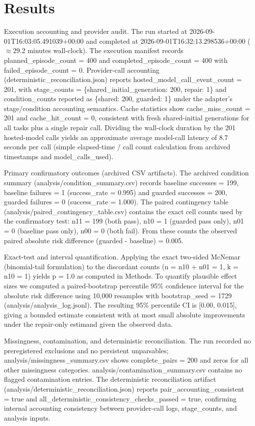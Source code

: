 \documentclass[conference]{IEEEtran}
\begin{document}
\section{Results}
Execution accounting and provider audit. The run started at 2026-09-01T16:03:05.491039+00:00 and completed at 2026-09-01T16:32:13.298536+00:00 (\ensuremath{\approx}29.2 minutes wall-clock). The execution manifest records planned\_episode\_count = 400 and completed\_episode\_count = 400 with failed\_episode\_count = 0. Provider-call accounting (deterministic\_reconciliation.json) reports hosted\_model\_call\_event\_count = 201, with stage\_counts = \{shared\_initial\_generation: 200, repair: 1\} and condition\_counts reported as \{shared: 200, guarded: 1\} under the adapter's stage/condition accounting semantics. Cache statistics show cache\_miss\_count = 201 and cache\_hit\_count = 0, consistent with fresh shared-initial generations for all tasks plus a single repair call. Dividing the wall-clock duration by the 201 hosted-model calls yields an approximate average model-call latency of 8.7 seconds per call (simple elapsed-time / call count calculation from archived timestamps and model\_calls\_used).

Primary confirmatory outcomes (archived CSV artifacts). The archived condition summary (analysis/condition\_summary.csv) records baseline successes = 199, baseline failures = 1 (success\_rate = 0.995) and guarded successes = 200, guarded failures = 0 (success\_rate = 1.000). The paired contingency table (analysis/paired\_contingency\_table.csv) contains the exact cell counts used by the confirmatory test: n11 = 199 (both pass), n10 = 1 (guarded pass only), n01 = 0 (baseline pass only), n00 = 0 (both fail). From these counts the observed paired absolute risk difference (guarded - baseline) = 0.005.

Exact-test and interval quantification. Applying the exact two-sided McNemar (binomial-tail formulation) to the discordant counts (n = n10 + n01 = 1, k = n10 = 1) yields p = 1.0 as computed in Methods. To quantify plausible effect sizes we computed a paired-bootstrap percentile 95\% confidence interval for the absolute risk difference using 10,000 resamples with bootstrap\_seed = 1729 (analysis/analysis\_log.jsonl). The resulting 95\% percentile CI is [0.00, 0.015], giving a bounded estimate consistent with at most small absolute improvements under the repair-only estimand given the observed data.

Missingness, contamination, and deterministic reconciliation. The run recorded no preregistered exclusions and no persistent unparsables; analysis/missingness\_summary.csv shows complete\_pairs = 200 and zeros for all other missingness categories. analysis/contamination\_summary.csv contains no flagged contamination entries. The deterministic reconciliation artifact (analysis/deterministic\_reconciliation.json) reports pair\_accounting\_consistent = true and all\_deterministic\_consistency\_checks\_passed = true, confirming internal accounting consistency between provider-call logs, stage\_counts, and analysis inputs.
\end{document}
